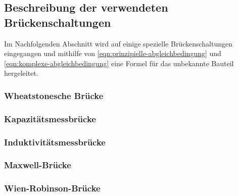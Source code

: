 \subsection{Beschreibung der verwendeten Brückenschaltungen}
\label{sec:spezielle-Schaltungen}

Im Nachfolgenden Abschnitt wird auf einige spezielle Brückenschaltungen eingegangen und mithilfe von
\autoref{eqn:prinzipielle-abgleichbedingung} und \autoref{eqn:komplexe-abgleichbedingung} 
eine Formel für das unbekannte Bauteil hergeleitet.

\subsubsection{Wheatstonesche Brücke}
\label{sec:WheatstonescheBrücke}

\subsubsection{Kapazitätsmessbrücke}
\label{sec:kapazitaetsmessbruecke}

\subsubsection{Induktivitätsmessbrücke}
\label{sec:induktivitätsmessbrücke}

\subsubsection{Maxwell-Brücke}
\label{sec:maxwell-bruecke}

\subsubsection{Wien-Robinson-Brücke}
\label{sec:wien-robinson-bruecke}


\cite{sample}
